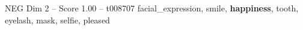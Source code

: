 \begin{textsample}{NEG Dim 2 – Score 1.00 – t008707}  \label{ex:f2_neg_026}
facial\_expression, smile, \textbf{happiness}, tooth, eyelash, mask, selfie, pleased

\end{textsample}
